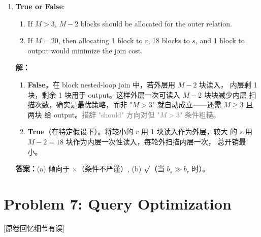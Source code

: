 \documentclass[11pt,a4paper]{article}
\newcommand{\solution}{\par\noindent\textcolor{ansblue}{\textbf{解：}}}
\newcommand{\answer}{\par\noindent\textcolor{ansred}{\textbf{答案：}}}
\newcommand{\recallnote}{\textcolor{ansred}{[原卷回忆细节有误]}}
\begin{document}
\begin{enumerate}[leftmargin=*,itemsep=6pt]
  \solution Merge join 的 transfer cost $= b_r + b_s$（两个关系各读一次）。
  Seek cost 取决于缓冲区大小。

  \answer Transfer: \textcolor{ansred}{$b_r + b_s$}。Seek: 取决于 $M$。

\item \textbf{True or False}:

  \begin{enumerate}[label=(\alph*)]
    \item If $M > 3$, $M-2$ blocks should be allocated for the outer relation.
    \item If $M = 20$, then allocating 1 block to $r$, 18 blocks to $s$, and
          1 block to output would minimize the join cost.
  \end{enumerate}

  \solution
  \begin{enumerate}[label=(\alph*)]
    \item \textbf{False}。在 block nested-loop join 中，若外层用 $M-2$ 块读入，
          内层剩 1 块，剩余 1 块用于 output。这样外层一次可读入 $M-2$ 块块减少内层
          扫描次数，确实是最优策略，而非 "$M > 3$" 就自动成立——还需 $M \ge 3$ 且两块
          给 output。\textcolor{gray}{措辞 "should" 方向对但 "$M > 3$" 条件粗糙。}
    \item \textbf{True}（在特定假设下）。将较小的 $r$ 用 1 块读入作为外层，较大
          的 $s$ 用 $M-2 = 18$ 块作为内层一次性读入，每轮外扫描内层一次，
          总开销最小。
  \end{enumerate}

  \answer (a) \textcolor{ansred}{倾向于 $\times$（条件不严谨）},
  (b) \textcolor{ansred}{$\surd$}（当 $b_s \gg b_r$ 时）。

\end{enumerate}

\section*{Problem 7: Query Optimization}

\recallnote
\end{document}
